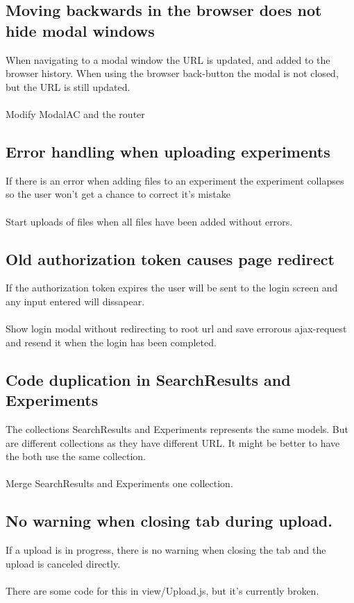 \subsection{Moving backwards in the browser does not hide modal windows}
When navigating to a modal window the URL is updated, and added to the browser history. When using the browser back-button the modal is not closed, but the URL is still updated. \\
\\
 Modify ModalAC and the router
\subsection{Error handling when uploading experiments}
If there is an error when adding files to an experiment the experiment collapses so the user won't get a chance to correct it's mistake \\
\\
Start uploads of files when all files have been added without errors. 
\subsection{Old authorization token causes page redirect}
If the authorization token expires the user will be sent to the login screen and any input entered will dissapear. \\
\\
Show login modal without redirecting to root url and save errorous ajax-request and resend it when the login has been completed.
\subsection{Code duplication in SearchResults and Experiments}
The collections SearchResults and Experiments represents the same models. But are different collections as they have different URL. It might be better to have the both use the same collection. \\
\\
Merge SearchResults and Experiments one collection.
\subsection{No warning when closing tab during upload.}
If a upload is in progress, there is no warning when closing the tab and the upload is canceled directly. \\
\\
There are some code for this in view/Upload.js, but it's currently broken.
\\
